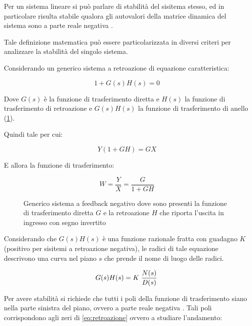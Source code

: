 Per un sistema lineare si può parlare di stabilità del sisitema stesso, ed in particolare risulta stabile qualora gli autovalori della matrice dinamica del sistema sono a parte reale negativa \cite{grasselli_sistemi_2008}.

Tale definizione matematica può essere particolarizzata in diversi criteri per analizzare la stabilità del singolo sistema.

Considerando un generico sistema a retroazione di equazione caratteristica:

\begin{equation}
	1+G(s)H(s)=0
			\label{eq:retroazione}
\end{equation}

Dove $G(s)$ è la funzione di trasferimento diretta e $H(s)$ la funzione di trasferimento di retroazione e $G(s)H(s)$ la funzione di trasferimento di anello (\cref{fig:sistema}).

Quindi tale per cui:

\begin{equation}
	Y(1+G H)=G X
\end{equation}

E allora la funzione di trasferimento:

\begin{equation}
	W=\frac{Y}{X}=\frac{G}{1+G H}
\end{equation}


\begin{figure}[t!]
	\centering
	\centering
\footnotesize{\def\svgwidth{0.95\linewidth}
	}
	\caption{Generico sistema a feedback negativo dove sono presenti la funzione di trasferimento diretta $G$ e la retroazione $H$ che riporta l'uscita in ingresso con segno invertito}
	\label{fig:sistema}
\end{figure}


Considerando che $G(s)H(s)$ è una funzione razionale fratta con guadagno $K$ (positivo per sisitemi a retroazione negativa), le radici di tale equazione descrivono una curva nel piano $s$ che prende il nome di luogo delle radici. 

\begin{equation}
	G(s)H(s)=K\left.N(s)\over D(s)\right.
\end{equation}

Per avere stabilità si richiede che tutti i poli della funzione di trasferimento siano nella parte sinistra del piano, ovvero a parte reale negativa \cite{marro_controlli_2004}. Tali poli corrispondono agli zeri di \cref{eq:retroazione} ovvero a studiare l'andamento:

